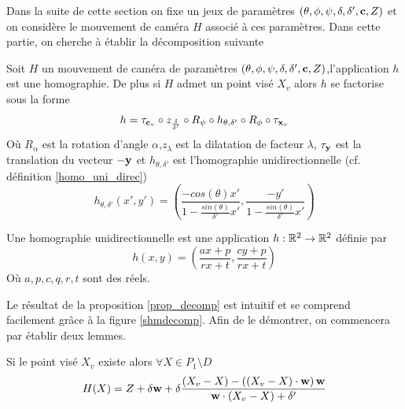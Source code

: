 Dans la suite de cette section on fixe un jeux de paramètres $(\theta,\phi,\psi,\delta,\delta',\mathbf{c},Z)$ et on considère le mouvement de caméra $H$ associé à ces paramètres.
Dans cette partie, on cherche à établir la décomposition suivante
\begin{prop}
 Soit  $H$ un mouvement de caméra de paramètres $(\theta,\phi,\psi,\delta,\delta',\mathbf{c},Z)$,l'application $h$ est une homographie.
 De plus si  $H$ admet un point visé $X_v$ alors $h$ se factorise sous la forme
\begin{equation}
h = \tau_{\mathbf{c}_v} \circ z_{\frac{\delta}{\delta'}}  \circ R_{\psi} \circ h_{\theta,\delta'} \circ R_{\phi} \circ \tau_{\mathbf{x}_v}
\label{formul_decomp}
\end{equation}
Où $R_{\alpha}$ est la rotation d'angle $\alpha$,$z_\lambda$ est la dilatation de facteur $\lambda$, $\tau_{\mathbf{y}}$ est  la translation du vecteur $-\mathbf{y}$ et $h_{\theta,\delta'}$ est l'homographie unidirectionnelle (cf. définition \ref{homo_uni_direc})
\begin{equation}
h_{\theta,\delta'}(x',y')=\left(\frac{-cos(\theta)x'}{1-\frac{sin(\theta)}{\delta'}x'} ,\frac{-y'}{1-\frac{sin(\theta)}{\delta'}x'}\right)
\label{mise_perspective}
\end{equation}
\label{prop_decomp}
\end{prop}

\begin{Def}
Une homographie unidirectionnelle est une application $h:\mathbb{R}^{2} \rightarrow \mathbb{R}^{2}$ définie par 
\begin{equation*}
h(x,y)=\left ( \frac{ax+p}{rx+t} , \frac{cy+p}{rx+t} \right)
\end{equation*}
Où $a,p,c,q,r,t$ sont des réels.
\label{homo_uni_direc}
\end{Def}

Le résultat de la proposition \ref{prop_decomp} est intuitif et se comprend facilement grâce à la figure \ref{shmdecomp}. Afin de le démontrer, on commencera par établir deux lemmes.

\begin{lem}Si le point visé $X_v$ existe alors
$\forall X \in P_1 \setminus D$
\begin{equation}
H(X)=Z+\delta \mathbf{w}+\delta \frac{(X_v-X)-\left((X_v-X)\cdot \mathbf{w} \right) \mathbf{w}}{\mathbf{w} \cdot (X_v-X)+\delta'}
\label{homo_form_geo}
\end{equation}
\end{lem}

